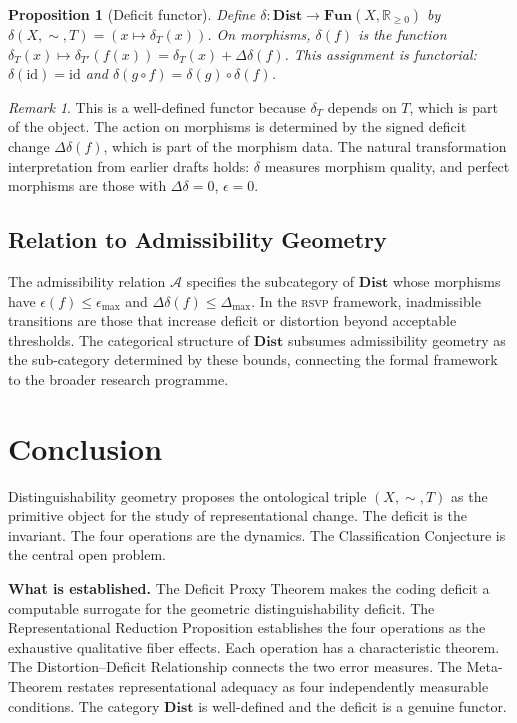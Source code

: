 \documentclass[12pt, a4paper]{article}
\theoremstyle{plain}
\newtheorem{proposition}[theorem]{Proposition}
\theoremstyle{definition}
\theoremstyle{remark}
\newtheorem{remark}[theorem]{Remark}
\newcommand{\RSVP}{\textsc{rsvp}}
\newcommand{\Ddelta}{\Delta\delta}
\newcommand{\eps}{\epsilon}
\begin{document}
\begin{proposition}[Deficit functor]
\label{prop:deficit-functor}
Define $\delta:\mathbf{Dist}\to\mathbf{Fun}(X,\mathbb{R}_{\ge 0})$ by
$\delta(X,\sim,T)=(x\mapsto\delta_T(x))$. On morphisms, $\delta(f)$ is
the function $\delta_T(x)\mapsto\delta_{T'}(f(x))=\delta_T(x)+\Ddelta(f)$.
This assignment is functorial: $\delta(\mathrm{id})=\mathrm{id}$ and
$\delta(g\circ f)=\delta(g)\circ\delta(f)$.
\end{proposition}

\begin{remark}
This is a well-defined functor because $\delta_T$ depends on $T$, which is
part of the object. The action on morphisms is determined by the signed
deficit change $\Ddelta(f)$, which is part of the morphism data. The
natural transformation interpretation from earlier drafts holds: $\delta$
measures morphism quality, and perfect morphisms are those with $\Ddelta=0$,
$\eps=0$.
\end{remark}

\subsection{Relation to Admissibility Geometry}

The admissibility relation $\mathcal{A}$ specifies the subcategory of
$\mathbf{Dist}$ whose morphisms have $\eps(f)\le\eps_{\max}$ and
$\Ddelta(f)\le\Delta_{\max}$. In the \RSVP{} framework, inadmissible transitions
are those that increase deficit or distortion beyond acceptable thresholds.
The categorical structure of $\mathbf{Dist}$ subsumes admissibility geometry
as the sub-category determined by these bounds, connecting the formal framework
to the broader research programme.

\section{Conclusion}
\label{sec:conclusion}

Distinguishability geometry proposes the ontological triple $(X,\sim,T)$
as the primitive object for the study of representational change. The deficit
is the invariant. The four operations are the dynamics. The Classification
Conjecture is the central open problem.

\medskip
\noindent\textbf{What is established.}
The Deficit Proxy Theorem makes the coding deficit a computable surrogate for
the geometric distinguishability deficit. The Representational Reduction
Proposition establishes the four operations as the exhaustive qualitative
fiber effects. Each operation has a characteristic theorem.
The Distortion--Deficit Relationship connects the two error measures. The
Meta-Theorem restates representational adequacy as four independently
measurable conditions. The category $\mathbf{Dist}$ is well-defined and the
deficit is a genuine functor.
\end{document}

